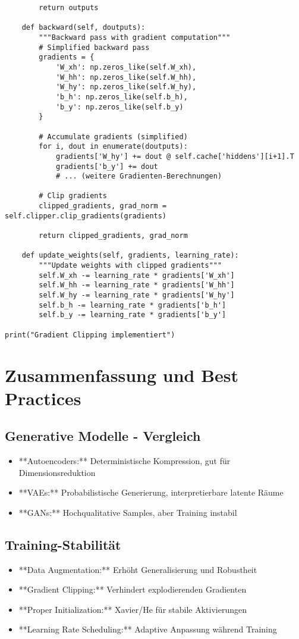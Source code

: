﻿\documentclass[12pt,a4paper]{article}
\begin{document}
\begin{lstlisting}
        return outputs
    
    def backward(self, doutputs):
        """Backward pass with gradient computation"""
        # Simplified backward pass
        gradients = {
            'W_xh': np.zeros_like(self.W_xh),
            'W_hh': np.zeros_like(self.W_hh),
            'W_hy': np.zeros_like(self.W_hy),
            'b_h': np.zeros_like(self.b_h),
            'b_y': np.zeros_like(self.b_y)
        }
        
        # Accumulate gradients (simplified)
        for i, dout in enumerate(doutputs):
            gradients['W_hy'] += dout @ self.cache['hiddens'][i+1].T
            gradients['b_y'] += dout
            # ... (weitere Gradienten-Berechnungen)
        
        # Clip gradients
        clipped_gradients, grad_norm = self.clipper.clip_gradients(gradients)
        
        return clipped_gradients, grad_norm
    
    def update_weights(self, gradients, learning_rate):
        """Update weights with clipped gradients"""
        self.W_xh -= learning_rate * gradients['W_xh']
        self.W_hh -= learning_rate * gradients['W_hh']
        self.W_hy -= learning_rate * gradients['W_hy']
        self.b_h -= learning_rate * gradients['b_h']
        self.b_y -= learning_rate * gradients['b_y']

print("Gradient Clipping implementiert")
\end{lstlisting}

\section*{Zusammenfassung und Best Practices}

\subsection*{Generative Modelle - Vergleich}
\begin{itemize}
    \item **Autoencoders:** Deterministische Kompression, gut für Dimensionsreduktion
    \item **VAEs:** Probabilistische Generierung, interpretierbare latente Räume
    \item **GANs:** Hochqualitative Samples, aber Training instabil
\end{itemize}

\subsection*{Training-Stabilität}
\begin{itemize}
    \item **Data Augmentation:** Erhöht Generalisierung und Robustheit
    \item **Gradient Clipping:** Verhindert explodierenden Gradienten
    \item **Proper Initialization:** Xavier/He für stabile Aktivierungen
    \item **Learning Rate Scheduling:** Adaptive Anpassung während Training
\end{itemize}
\end{document}
